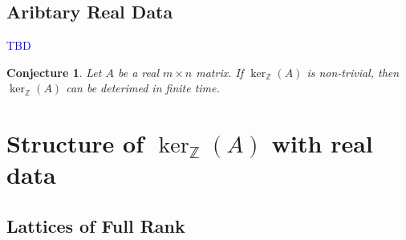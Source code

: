 \documentclass{article}
\newcommand{\Z}[0]{\mathbb{Z}}		%
\newcommand{\R}[0]{\mathbb{R}}		%
\newtheorem{thm}{Theorem}[section]
\newtheorem{prop}[thm]{Proposition}
\newtheorem{conj}[thm]{Conjecture}
\theoremstyle{definition}
\theoremstyle{remark}
\begin{document}
\subsection{Aribtary Real Data}
\textcolor{blue}{TBD}
\begin{conj}
    Let $A$ be a real $m\times n$ matrix. If $\ker_\Z(A)$  is non-trivial, then $\ker_\Z(A)$ can be deterimed in finite time. 
\end{conj}
\section{Structure of $\ker_\Z(A)$ with real data}
\subsection{Lattices of Full Rank}


\end{document}

